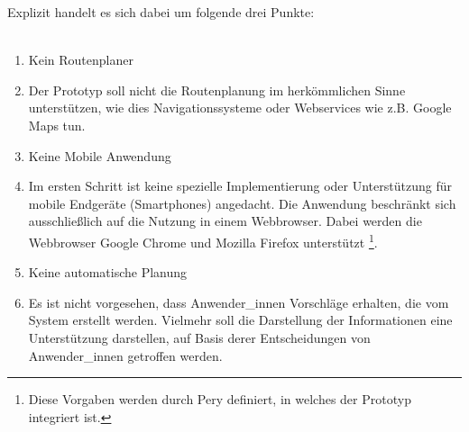 \documentclass[Bachelorarbeit.tex]{subfiles}
\begin{document}
Explizit handelt es sich dabei um folgende drei Punkte:\\
\\
\begin{enumerate}
	\item Kein Routenplaner
	\item[] Der Prototyp soll nicht die Routenplanung im herkömmlichen Sinne unterstützen, wie dies Navigationssysteme oder Webservices wie z.B. Google Maps tun.
	\item Keine Mobile Anwendung
	\item [] Im ersten Schritt ist keine spezielle Implementierung oder Unterstützung für mobile Endgeräte (Smartphones) angedacht. Die Anwendung beschränkt sich ausschließlich auf die Nutzung in einem Webbrowser. Dabei werden die Webbrowser Google Chrome und Mozilla Firefox unterstützt \footnote{Diese Vorgaben werden durch Pery definiert, in welches der Prototyp integriert ist.}.
	\item Keine automatische Planung
	\item[] Es ist nicht vorgesehen, dass Anwender\_innen Vorschläge erhalten, die vom System erstellt werden. Vielmehr soll die Darstellung der Informationen eine Unterstützung darstellen, auf Basis derer Entscheidungen von Anwender\_innen getroffen werden.
\end{enumerate}
\end{document}

